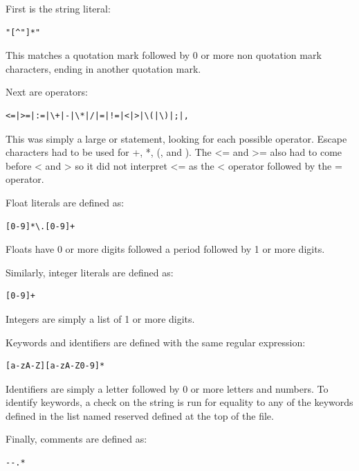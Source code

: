 \documentclass[12pt]{article}
\begin{document}
                First is the string literal:

                \begin{verbatim}
"[^"]*"
                \end{verbatim}

                This matches a quotation mark followed by 0 or more non quotation mark characters, ending in another quotation mark.

                Next are operators:

                \begin{verbatim}
<=|>=|:=|\+|-|\*|/|=|!=|<|>|\(|\)|;|,
                \end{verbatim}

                This was simply a large or statement, looking for each possible operator. Escape characters had to be used for +, *, (, and ). The <= and >= also had to come before < and > so it did not interpret <= as the < operator followed by the = operator.

                Float literals are defined as:

                \begin{verbatim}
[0-9]*\.[0-9]+
                \end{verbatim}

                Floats have 0 or more digits followed a period followed by 1 or more digits.

                Similarly, integer literals are defined as: 

                \begin{verbatim}
[0-9]+
                \end{verbatim}

                Integers are simply a list of 1 or more digits.

                Keywords and identifiers are defined with the same regular expression:

                \begin{verbatim}
[a-zA-Z][a-zA-Z0-9]*
                \end{verbatim}

                Identifiers are simply a letter followed by 0 or more letters and numbers. To identify keywords, a check on the string is run for equality to any of the keywords defined in the list named reserved defined at the top of the file.

                Finally, comments are defined as:

                \begin{verbatim}
--.*
                \end{verbatim}
\end{document}
